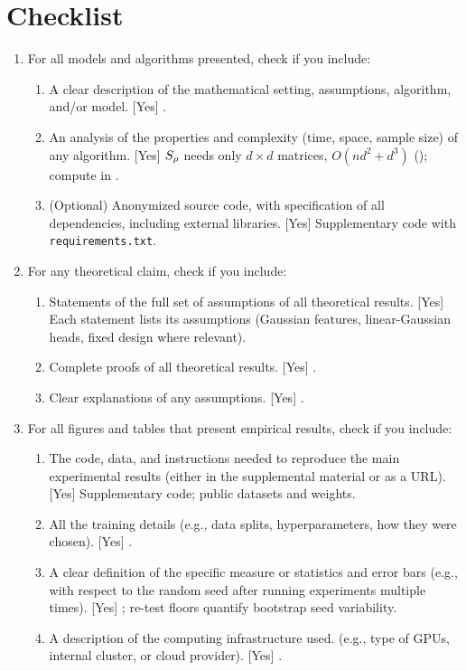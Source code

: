 \section*{Checklist}

\begin{enumerate}

  \item For all models and algorithms presented, check if you include:
  \begin{enumerate}
    \item A clear description of the mathematical setting, assumptions, algorithm, and/or model. [Yes] .
    \item An analysis of the properties and complexity (time, space, sample size) of any algorithm. [Yes] $S_{\rho}$ needs only $d\times d$ matrices, $O(nd^2+d^3)$ (); compute in .
    \item (Optional) Anonymized source code, with specification of all dependencies, including external libraries. [Yes] Supplementary code with \texttt{requirements.txt}.
  \end{enumerate}

  \item For any theoretical claim, check if you include:
  \begin{enumerate}
    \item Statements of the full set of assumptions of all theoretical results. [Yes] Each statement lists its assumptions (Gaussian features, linear-Gaussian heads, fixed design where relevant).
    \item Complete proofs of all theoretical results. [Yes] .
    \item Clear explanations of any assumptions. [Yes] .
  \end{enumerate}

  \item For all figures and tables that present empirical results, check if you include:
  \begin{enumerate}
    \item The code, data, and instructions needed to reproduce the main experimental results (either in the supplemental material or as a URL). [Yes] Supplementary code; public datasets and weights.
    \item All the training details (e.g., data splits, hyperparameters, how they were chosen). [Yes] .
    \item A clear definition of the specific measure or statistics and error bars (e.g., with respect to the random seed after running experiments multiple times). [Yes] ; re-test floors quantify bootstrap seed variability.
    \item A description of the computing infrastructure used. (e.g., type of GPUs, internal cluster, or cloud provider). [Yes] .
  \end{enumerate}


\end{enumerate}

